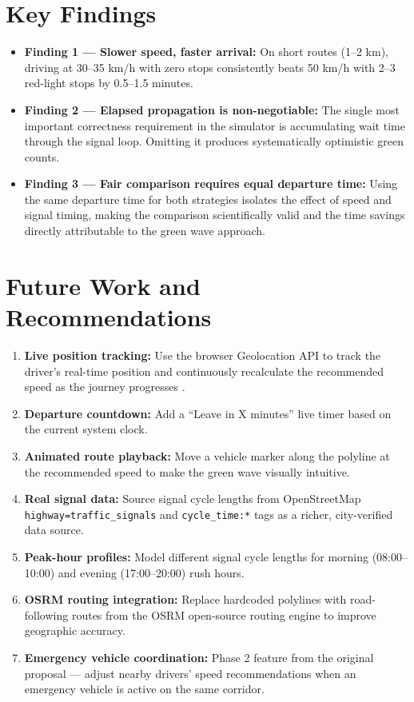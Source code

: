 \documentclass[12pt,a4paper]{report}
\begin{document}
\section{Key Findings}

\begin{itemize}
  \item \textbf{Finding 1 --- Slower speed, faster arrival:} On short routes
    (1--2 km), driving at 30--35 km/h with zero stops consistently beats
    50 km/h with 2--3 red-light stops by 0.5--1.5 minutes.
  \item \textbf{Finding 2 --- Elapsed propagation is non-negotiable:} The
    single most important correctness requirement in the simulator is
    accumulating wait time through the signal loop. Omitting it produces
    systematically optimistic green counts.
  \item \textbf{Finding 3 --- Fair comparison requires equal departure time:}
    Using the same departure time for both strategies isolates the effect of
    speed and signal timing, making the comparison scientifically valid and
    the time savings directly attributable to the green wave approach.
\end{itemize}

\section{Future Work and Recommendations}

\begin{enumerate}
  \item \textbf{Live position tracking:} Use the browser Geolocation API to
    track the driver's real-time position and continuously recalculate the
    recommended speed as the journey progresses \cite{OSM26}.
  \item \textbf{Departure countdown:} Add a ``Leave in X minutes'' live timer
    based on the current system clock.
  \item \textbf{Animated route playback:} Move a vehicle marker along the
    polyline at the recommended speed to make the green wave visually
    intuitive.
  \item \textbf{Real signal data:} Source signal cycle lengths from
    OpenStreetMap \texttt{highway=traffic\_signals} and
    \texttt{cycle\_time:*} tags as a richer, city-verified data source.
  \item \textbf{Peak-hour profiles:} Model different signal cycle lengths for
    morning (08:00--10:00) and evening (17:00--20:00) rush hours.
  \item \textbf{OSRM routing integration:} Replace hardcoded polylines with
    road-following routes from the OSRM open-source routing engine to improve
    geographic accuracy.
  \item \textbf{Emergency vehicle coordination:} Phase 2 feature from the
    original proposal --- adjust nearby drivers' speed recommendations when an
    emergency vehicle is active on the same corridor.
\end{enumerate}
\end{document}

